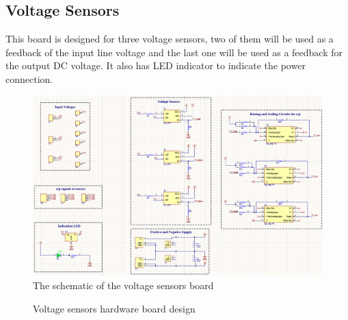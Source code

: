 \documentclass[12pt,a4paper]{book}
\begin{document}
\subsection{Voltage Sensors}
This board is designed for three voltage sensors, two of them will be used as a feedback of the input line voltage and the last one will be used as a feedback for the output DC voltage. It also has LED indicator to indicate the power connection.
\begin{figure}[ht]
  \centering
  \includegraphics[width = 16cm]{image40.png}
  \caption{The schematic of the voltage sensors board}
  \label{fig:image40}
\end{figure}
\begin{figure}[ht!]
  \centering

  \hfill

  \caption{Voltage sensors hardware board design}
  \label{fig:image41}
\end{figure}
\end{document}
